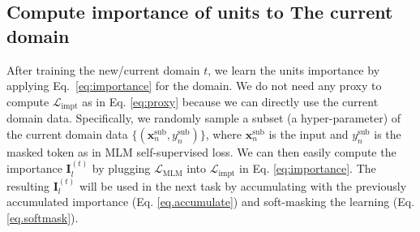 \documentclass{article} \usepackage{iclr2023_conference,times}
\begin{document}
\subsection{Compute importance of units to The current domain}
\label{sec:after_training}
\vspace{-1mm}
After training the new/current domain $t$, we learn the units importance by applying Eq.~\ref{eq:importance} for the domain. We do not need any proxy to compute  $\mathcal{L}_{\text{impt}}$ as in Eq. \ref{eq:proxy} because we can directly use the current domain data. Specifically, we randomly sample a subset (a hyper-parameter) of the current domain data $\{(\bm{x}^{\text{sub}}_n,y^{\text{sub}}_n)\}$, where $\bm{x}^{\text{sub}}_n$ is the input and $y^{\text{sub}}_n$ is the masked token as in MLM self-supervised loss. We can then easily compute the importance $\bm{I}^{(t)}_{l}$ by plugging $\mathcal{L}_{\text{MLM}}$ into $\mathcal{L}_{\text{impt}}$ in Eq. \ref{eq:importance}. The resulting $\bm{I}^{(t)}_{l}$ will be used in the next task by accumulating with the previously accumulated importance (Eq. \ref{eq.accumulate}) and soft-masking the learning (Eq. \ref{eq.softmask}). 








\begin{table*}[]
\centering
{}
\vspace{-3mm}
\caption{
Statistics of datasets for DAP-training. {More details of }their end-task supervised learning datasets are given in Appendix~\ref{ap:dataset}. } 
\label{tab:dataset}
\vspace{-4mm}
\end{table*}
\end{document}
